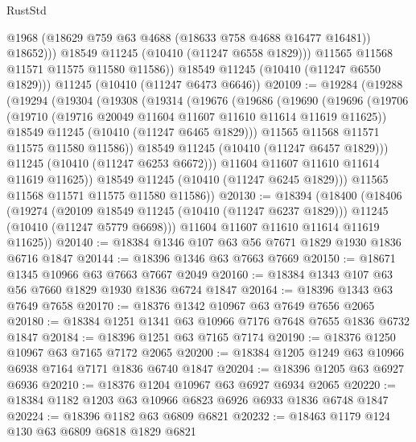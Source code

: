\begin{lexlean}{RustStd}
\begin{coremodule}
                  @1968
                  (@18629 @759 @63 @4688 (@18633 @758 @4688 @16477 @16481))
                  @18652)))
            @18549
            @11245
            (@10410 (@11247 @6558 @1829)))
          @11565
          @11568
          @11571
          @11575
          @11580
          @11586))
      @18549
      @11245
      (@10410 (@11247 @6550 @1829)))
    @11245
    (@10410 (@11247 @6473 @6646))
@20109 := @19284
    (@19288
      (@19294
        (@19304
          (@19308
            (@19314
              (@19676
                (@19686
                  (@19690
                    (@19696
                      (@19706
                        (@19710 (@19716 @20049 @11604 @11607 @11610 @11614 @11619 @11625))
                        @18549
                        @11245
                        (@10410 (@11247 @6465 @1829)))
                      @11565
                      @11568
                      @11571
                      @11575
                      @11580
                      @11586))
                  @18549
                  @11245
                  (@10410 (@11247 @6457 @1829)))
                @11245
                (@10410 (@11247 @6253 @6672)))
              @11604
              @11607
              @11610
              @11614
              @11619
              @11625))
          @18549
          @11245
          (@10410 (@11247 @6245 @1829)))
        @11565
        @11568
        @11571
        @11575
        @11580
        @11586))
@20130 := @18394
    (@18400
      (@18406
        (@19274
          (@20109 @18549 @11245 (@10410 (@11247 @6237 @1829)))
          @11245
          (@10410 (@11247 @5779 @6698)))
        @11604
        @11607
        @11610
        @11614
        @11619
        @11625))
@20140 := @18384 @1346 @107 @63 @56 @7671 @1829 @1930 @1836 @6716 @1847
@20144 := @18396 @1346 @63 @7663 @7669
@20150 := @18671 @1345 @10966 @63 @7663 @7667 @2049
@20160 := @18384 @1343 @107 @63 @56 @7660 @1829 @1930 @1836 @6724 @1847
@20164 := @18396 @1343 @63 @7649 @7658
@20170 := @18376 @1342 @10967 @63 @7649 @7656 @2065
@20180 := @18384 @1251 @1341 @63 @10966 @7176 @7648 @7655 @1836 @6732 @1847
@20184 := @18396 @1251 @63 @7165 @7174
@20190 := @18376 @1250 @10967 @63 @7165 @7172 @2065
@20200 := @18384 @1205 @1249 @63 @10966 @6938 @7164 @7171 @1836 @6740 @1847
@20204 := @18396 @1205 @63 @6927 @6936
@20210 := @18376 @1204 @10967 @63 @6927 @6934 @2065
@20220 := @18384 @1182 @1203 @63 @10966 @6823 @6926 @6933 @1836 @6748 @1847
@20224 := @18396 @1182 @63 @6809 @6821
@20232 := @18463 @1179 @124 @130 @63 @6809 @6818 @1829 @6821

\end{coremodule}
\end{lexlean}
